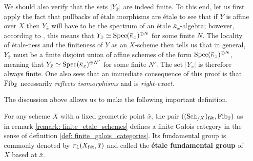 \begin{remark}
                We should also verify that the sets $|Y_{\bar{x}}|$ are indeed finite. To this end, let us first apply the fact that pullbacks of \'etale morphisms are \'etale to see that if $Y$ is affine over $X$ then $Y_{\bar{x}}$ will have to be the spectrum of an \'etale $\bar{\kappa}_x$-algebra; however, according to \cite[\href{https://stacks.math.columbia.edu/tag/00U3}{Tag 00U3}]{stacks}, this means that $Y_{\bar{x}} \simeq \mathrm{Spec} (\bar{\kappa}_x)^{\oplus N}$ for some finite $N$. The locality of \'etale-ness and the finiteness of $Y$ as an $X$-scheme then tells us that in general, $Y_{\bar{x}}$ must be a finite disjoint union of affine schemes of the form $\mathrm{Spec} (\bar{\kappa}_x)^{\oplus N}$, meaning that $Y_{\bar{x}} \simeq \mathrm{Spec} (\bar{\kappa}_x)^{\oplus N'}$ for some finite $N'$. The set $|Y_{\bar{x}}|$ is therefore always finite. One also sees that an immediate consequence of this proof is that $\mathrm{Fib}_{\bar{x}}$ necessarily \textit{reflects isomorphisms} and is \textit{right-exact}. 
            \end{remark}
            
            The discussion above allows us to make the following important definition.
            \begin{definition} \label{def: etale_fundamental_groups_of_schemes}
                For any scheme $X$ with a fixed geometric point $\bar{x}$, the pair $((\mathrm{Sch}_{/X})_{\mathrm{f\acute{e}t}}, \mathrm{Fib}_{\bar{x}})$ as in remark \ref{remark: finite_etale_schemes} defines a finite Galois category in the sense of definition \ref{def: finite_galois_categories}. Its fundamental group is commonly denoted by $\pi_1(X_{\mathrm{f\acute{e}t}}, \bar{x})$ and called the \textbf{\'etale fundamental group} of $X$ based at $\bar{x}$.
            \end{definition}
            
